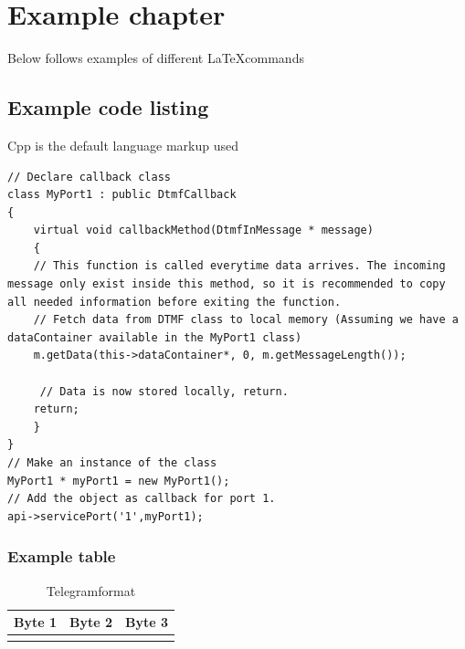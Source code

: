 \chapter{Example chapter}
Below follows examples of different \LaTeX commands
\section{Example code listing}
Cpp is the default language markup used




\begin{lstlisting}[language={[ANSI]C++},caption={Example code},label={lst:examplecode}]
// Declare callback class
class MyPort1 : public DtmfCallback
{
	virtual void callbackMethod(DtmfInMessage * message)
	{
    // This function is called everytime data arrives. The incoming message only exist inside this method, so it is recommended to copy all needed information before exiting the function.
    // Fetch data from DTMF class to local memory (Assuming we have a dataContainer available in the MyPort1 class)
    m.getData(this->dataContainer*, 0, m.getMessageLength());

     // Data is now stored locally, return.
    return;
	}
}
// Make an instance of the class
MyPort1 * myPort1 = new MyPort1();
// Add the object as callback for port 1.
api->servicePort('1',myPort1);
\end{lstlisting}



\subsection{Example table}

\begin{table}[htb]								%
	\begin{center}
	\begin{tabular}{c|c|c}					%
	Byte 1 & Byte 2 & Byte 3 \\			%
	\hline													%
	\verb@TYPE@ & \verb@KOMMANDO@ & \verb@DATA@ \\
	\end{tabular}
	\end{center}
	\caption{Telegramformat}				%
	\label{tab:telegramformat}			%
\end{table}






